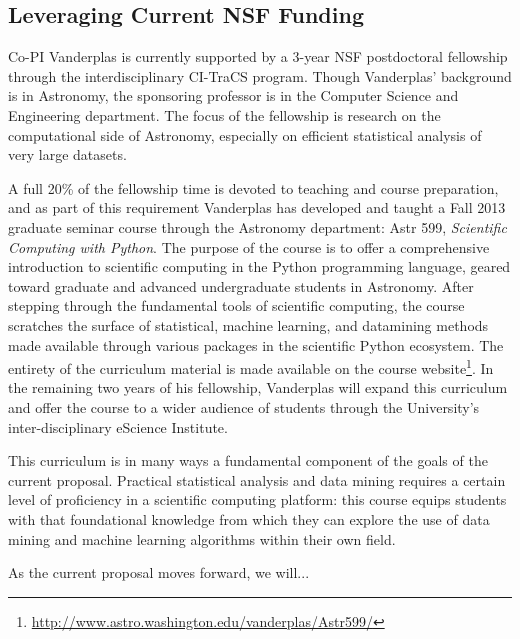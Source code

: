 \subsection{Leveraging Current NSF Funding}

Co-PI Vanderplas is currently supported by a 3-year NSF postdoctoral
fellowship through the interdisciplinary CI-TraCS program.  Though
Vanderplas' background is in Astronomy, the sponsoring professor is in
the Computer Science and Engineering department.  The focus of the
fellowship is research on the computational side of Astronomy, especially
on efficient statistical analysis of very large datasets.

A full 20\% of the fellowship time is devoted to teaching and course
preparation, and as part of this requirement Vanderplas has developed
and taught a Fall 2013
graduate seminar course through the Astronomy department:
Astr 599, {\it Scientific Computing with Python}.  The purpose of the
course is to offer a comprehensive introduction to scientific computing
in the Python programming language, geared toward graduate 
and advanced undergraduate students in Astronomy.
After stepping through the fundamental tools of scientific computing,
the course scratches the surface of statistical, machine learning, and
datamining methods made available through various packages in the scientific
Python ecosystem. The entirety of
the curriculum material is made available on the course website\footnote{
\url{http://www.astro.washington.edu/vanderplas/Astr599/}}.
In the remaining two years of his fellowship, Vanderplas will expand this
curriculum and offer the course to a wider audience of students through
the University's inter-disciplinary eScience Institute.

This curriculum is in many ways a fundamental component of the goals of the
current proposal.  Practical statistical analysis and data mining 
requires a certain level of proficiency in a scientific computing platform:
this course equips students with that foundational knowledge from which they
can explore the use of data mining and machine learning algorithms within
their own field.

As the current proposal moves forward, we will...
